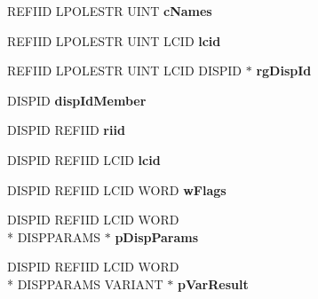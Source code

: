 \begin{DoxyCompactItemize}
\item 
\hypertarget{struct_i_badge_icon_synced_vtbl_a4540ebd700b9749b17e89355aae5ed64}{R\-E\-F\-I\-I\-D L\-P\-O\-L\-E\-S\-T\-R U\-I\-N\-T {\bfseries c\-Names}}\label{struct_i_badge_icon_synced_vtbl_a4540ebd700b9749b17e89355aae5ed64}

\item 
\hypertarget{struct_i_badge_icon_synced_vtbl_adc059a77ecc628a893a3647beb9ddb46}{R\-E\-F\-I\-I\-D L\-P\-O\-L\-E\-S\-T\-R U\-I\-N\-T L\-C\-I\-D {\bfseries lcid}}\label{struct_i_badge_icon_synced_vtbl_adc059a77ecc628a893a3647beb9ddb46}

\item 
\hypertarget{struct_i_badge_icon_synced_vtbl_a6532df0d926f5e70643f4da664bd816b}{R\-E\-F\-I\-I\-D L\-P\-O\-L\-E\-S\-T\-R U\-I\-N\-T L\-C\-I\-D D\-I\-S\-P\-I\-D $\ast$ {\bfseries rg\-Disp\-Id}}\label{struct_i_badge_icon_synced_vtbl_a6532df0d926f5e70643f4da664bd816b}

\item 
\hypertarget{struct_i_badge_icon_synced_vtbl_aae558b57df7f56662b845821767b3db2}{D\-I\-S\-P\-I\-D {\bfseries disp\-Id\-Member}}\label{struct_i_badge_icon_synced_vtbl_aae558b57df7f56662b845821767b3db2}

\item 
\hypertarget{struct_i_badge_icon_synced_vtbl_af6c7415702e8190f01a9dbc61474ce04}{D\-I\-S\-P\-I\-D R\-E\-F\-I\-I\-D {\bfseries riid}}\label{struct_i_badge_icon_synced_vtbl_af6c7415702e8190f01a9dbc61474ce04}

\item 
\hypertarget{struct_i_badge_icon_synced_vtbl_a65b063f2f2c5121515c1c17f6f8b887d}{D\-I\-S\-P\-I\-D R\-E\-F\-I\-I\-D L\-C\-I\-D {\bfseries lcid}}\label{struct_i_badge_icon_synced_vtbl_a65b063f2f2c5121515c1c17f6f8b887d}

\item 
\hypertarget{struct_i_badge_icon_synced_vtbl_a4adcb2b0cb19e7ed9786ef9344d9ec83}{D\-I\-S\-P\-I\-D R\-E\-F\-I\-I\-D L\-C\-I\-D W\-O\-R\-D {\bfseries w\-Flags}}\label{struct_i_badge_icon_synced_vtbl_a4adcb2b0cb19e7ed9786ef9344d9ec83}

\item 
\hypertarget{struct_i_badge_icon_synced_vtbl_a12c1346e390670f10fe1a8188141c88e}{D\-I\-S\-P\-I\-D R\-E\-F\-I\-I\-D L\-C\-I\-D W\-O\-R\-D \\*
D\-I\-S\-P\-P\-A\-R\-A\-M\-S $\ast$ {\bfseries p\-Disp\-Params}}\label{struct_i_badge_icon_synced_vtbl_a12c1346e390670f10fe1a8188141c88e}

\item 
\hypertarget{struct_i_badge_icon_synced_vtbl_af4e6233fef74337dab6322c124289308}{D\-I\-S\-P\-I\-D R\-E\-F\-I\-I\-D L\-C\-I\-D W\-O\-R\-D \\*
D\-I\-S\-P\-P\-A\-R\-A\-M\-S V\-A\-R\-I\-A\-N\-T $\ast$ {\bfseries p\-Var\-Result}}\label{struct_i_badge_icon_synced_vtbl_af4e6233fef74337dab6322c124289308}


\end{DoxyCompactItemize}
